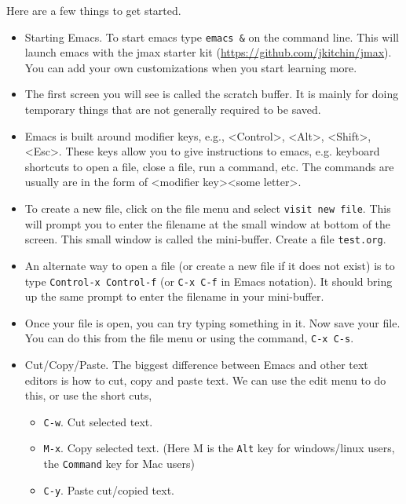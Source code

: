 \documentclass[11pt]{article}
\begin{document}
Here are a few things to get started.

\begin{itemize}
\item Starting Emacs. To start emacs type \texttt{emacs \&} on the command line. This will launch emacs with the jmax starter kit (\url{https://github.com/jkitchin/jmax}). You can add your own customizations when you start learning more.

\item The first screen you will see is called the scratch buffer. It is mainly for doing temporary things that are not generally required to be saved.

\item Emacs is built around modifier keys, e.g., <Control>, <Alt>, <Shift>, <Esc>. These keys allow you to give instructions to emacs, e.g. keyboard shortcuts to open a file, close a file, run a command, etc. The commands are usually are in the form of <modifier key><some letter>.

\item To create a new file, click on the file menu and select \texttt{visit new file}. This will prompt you to enter the filename at the small window at bottom of the screen. This small window is called the mini-buffer. Create a file \texttt{test.org}.

\item An alternate way to open a file (or create a new file if it does not exist) is to type \texttt{Control-x Control-f} (or \texttt{C-x C-f} in Emacs notation). It should bring up the same prompt to enter the filename in your mini-buffer.

\item Once your file is open, you can try typing something in it. Now save your file. You can do this from the file menu or using the command, \texttt{C-x C-s}.

\item Cut/Copy/Paste. The biggest difference between Emacs and other text editors is how to cut, copy and paste text. We can use the edit menu to do this, or use the short cuts,

\begin{itemize}
\item \texttt{C-w}. Cut selected text.
\item \texttt{M-x}. Copy selected text. (Here M is the \texttt{Alt} key for windows/linux users, the \texttt{Command} key for Mac users)
\item \texttt{C-y}. Paste cut/copied text.
\end{itemize}


\end{itemize}
\end{document}
